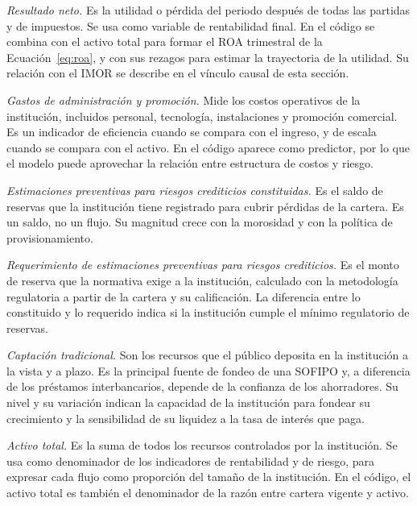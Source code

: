 \textit{Resultado neto.} Es la utilidad o pérdida del periodo después de todas las partidas y de impuestos. Se usa como variable de rentabilidad final. En el código se combina con el activo total para formar el ROA trimestral de la Ecuación~\eqref{eq:roa}, y con sus rezagos para estimar la trayectoria de la utilidad. Su relación con el IMOR se describe en el vínculo causal de esta sección.

\textit{Gastos de administración y promoción.} Mide los costos operativos de la institución, incluidos personal, tecnología, instalaciones y promoción comercial. Es un indicador de eficiencia cuando se compara con el ingreso, y de escala cuando se compara con el activo. En el código aparece como predictor, por lo que el modelo puede aprovechar la relación entre estructura de costos y riesgo.

\textit{Estimaciones preventivas para riesgos crediticios constituidas.} Es el saldo de reservas que la institución tiene registrado para cubrir pérdidas de la cartera. Es un saldo, no un flujo. Su magnitud crece con la morosidad y con la política de provisionamiento. %

\textit{Requerimiento de estimaciones preventivas para riesgos crediticios.} Es el monto de reserva que la normativa exige a la institución, calculado con la metodología regulatoria a partir de la cartera y su calificación. La diferencia entre lo constituido y lo requerido indica si la institución cumple el mínimo regulatorio de reservas. %

\textit{Captación tradicional.} Son los recursos que el público deposita en la institución a la vista y a plazo. Es la principal fuente de fondeo de una SOFIPO y, a diferencia de los préstamos interbancarios, depende de la confianza de los ahorradores. Su nivel y su variación indican la capacidad de la institución para fondear su crecimiento y la sensibilidad de su liquidez a la tasa de interés que paga.

\textit{Activo total.} Es la suma de todos los recursos controlados por la institución. Se usa como denominador de los indicadores de rentabilidad y de riesgo, para expresar cada flujo como proporción del tamaño de la institución. En el código, el activo total es también el denominador de la razón entre cartera vigente y activo.


